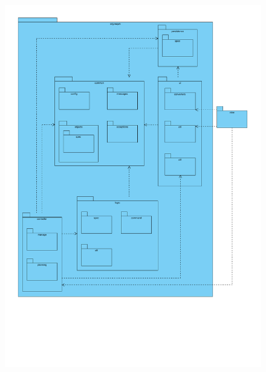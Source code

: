 \documentclass[fontsize=12pt,paper=a4,twoside]{scrartcl}
\begin{document}
\begin{figure}[H]
\centering
\includegraphics[width=\textwidth]{packages.pdf}
\end{figure}

\newpage
\end{document}
